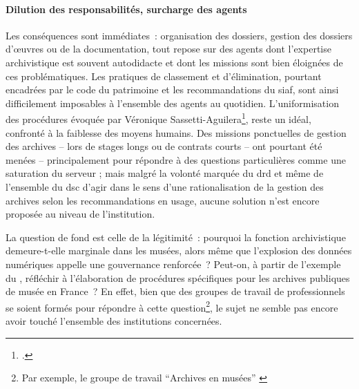 \paragraph*{Dilution des responsabilités, surcharge des agents}
Les conséquences sont immédiates : organisation des dossiers, gestion des dossiers d’œuvres ou de la documentation, tout repose sur des agents dont l’expertise archivistique est souvent autodidacte et dont les missions sont bien éloignées de ces problématiques. Les pratiques de classement et d’élimination, pourtant encadrées par le code du patrimoine et les recommandations du \ac{siaf}, sont ainsi difficilement imposables à l'ensemble des agents au quotidien. L’uniformisation des procédures évoquée par Véronique Sassetti-Aguilera\footcite{sassetti-aguileraArchivesMuseesDiversites2020a}, reste un idéal, confronté à la faiblesse des moyens humains. Des missions ponctuelles de gestion des archives -- lors de stages longs ou de contrats courts -- ont pourtant été menées -- principalement pour répondre à des questions particulières comme une saturation du serveur ; mais malgré la volonté marquée du \ac{drd} et même de l'ensemble du \ac{dsc} d'agir dans le sens d'une rationalisation de la gestion des archives selon les recommandations en usage, aucune solution n'est encore proposée au niveau de l'institution.

La question de fond est celle de la légitimité : pourquoi la fonction archivistique demeure-t-elle marginale dans les musées, alors même que l’explosion des données numériques appelle une gouvernance renforcée ? Peut-on, à partir de l’exemple du \mae, réfléchir à l’élaboration de procédures spécifiques pour les archives publiques de musée en France ? En effet, bien que des groupes de travail de professionnels se soient formés pour répondre à cette question\footnote{Par exemple, le groupe de travail \enquote{Archives en musées} \cite{clergeauReseauArchivesMusees2015a}}, le sujet ne semble pas encore avoir touché l'ensemble des institutions concernées.
